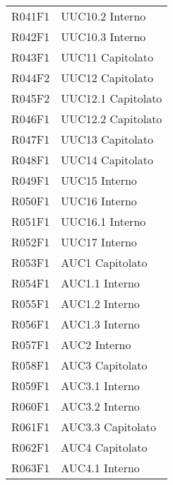 \documentclass[../analisi-dei-requisiti.tex]{subfiles}
\begin{document}
\begin{longtable}[H]{ p{4cm} | p{4cm} }
  R041F1                               & UUC10.2 Interno               \\
  R042F1                               & UUC10.3 Interno               \\
  R043F1                               & UUC11 Capitolato              \\
  R044F2                               & UUC12 Capitolato              \\
  R045F2                               & UUC12.1 Capitolato            \\
  R046F1                               & UUC12.2 Capitolato            \\
  R047F1                               & UUC13 Capitolato              \\
  R048F1                               & UUC14 Capitolato              \\
  R049F1                               & UUC15 Interno                 \\
  R050F1                               & UUC16 Interno                 \\
  R051F1                               & UUC16.1 Interno               \\
  R052F1                               & UUC17 Interno                 \\
  R053F1                               & AUC1 Capitolato               \\
  R054F1                               & AUC1.1 Interno                \\
  R055F1                               & AUC1.2 Interno                \\
  R056F1                               & AUC1.3 Interno                \\
  R057F1                               & AUC2 Interno                  \\
  R058F1                               & AUC3 Capitolato               \\
  R059F1                               & AUC3.1 Interno                \\
  R060F1                               & AUC3.2 Interno                \\
  R061F1                               & AUC3.3 Capitolato             \\
  R062F1                               & AUC4 Capitolato               \\
  R063F1                               & AUC4.1 Interno                \\

\end{longtable}
\end{document}
